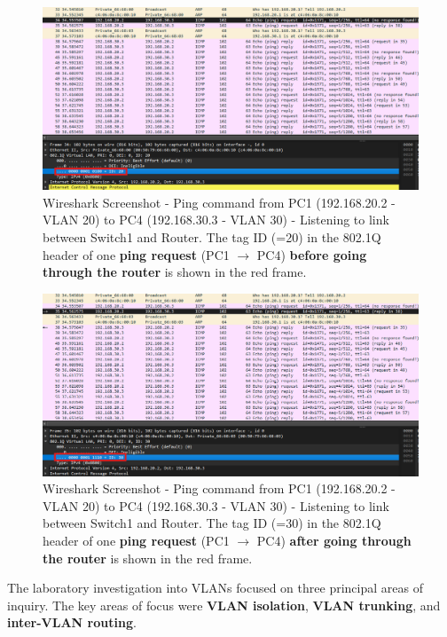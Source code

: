 \documentclass[10pt,a4paper]{ULBreport}
\begin{document}
\begin{figure}[H]
    \centering
    \includegraphics[width=\textwidth]{Images/intervlanID20.png}
    \caption{Wireshark Screenshot - Ping command from PC1 (192.168.20.2 - VLAN 20) to PC4 (192.168.30.3 - VLAN 30) - Listening to link between Switch1 and Router. The tag ID (=20) in the 802.1Q header of one \textbf{ping request} (PC1 $\rightarrow$ PC4) \textbf{before going through the router} is shown in the red frame.}
    \label{vlan20}
\end{figure}

\begin{figure}[H]
    \centering
    \includegraphics[width=\textwidth]{Images/intervlanID30.png}
    \caption{Wireshark Screenshot - Ping command from PC1 (192.168.20.2 - VLAN 20) to PC4 (192.168.30.3 - VLAN 30) - Listening to link between Switch1 and Router. The tag ID (=30) in the 802.1Q header of one \textbf{ping request} (PC1 $\rightarrow$ PC4) \textbf{after going through the router} is shown in the red frame.}
    \label{vlan30}
\end{figure}



The laboratory investigation into VLANs focused on three principal areas of inquiry. The key areas of focus were \textbf{VLAN isolation}, \textbf{VLAN trunking}, and \textbf{inter-VLAN routing}.
\end{document}
